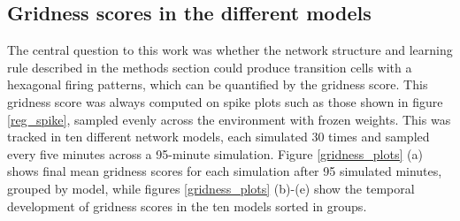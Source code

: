 \documentclass{article}
\begin{document}
    \subsection{Gridness scores in the different models} \label{Gscore}
    
    The central question to this work was whether the network structure and learning rule described in the methods section could produce transition cells with a hexagonal firing patterns, which can be quantified by the gridness score. This gridness score was always computed on spike plots such as those shown in figure \ref{reg_spike}, sampled evenly across the environment with frozen weights. This was tracked in ten different network models, each simulated 30 times and sampled every five minutes across a 95-minute simulation. Figure \ref{gridness_plots} (a) shows final mean gridness scores for each simulation after 95 simulated minutes, grouped by model, while figures \ref{gridness_plots} (b)-(e) show the temporal development of gridness scores in the ten models sorted in groups.
    
\end{document}
